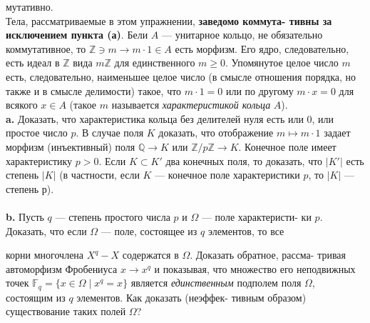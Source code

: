 мутативно.\\
\hspace*{10pt}
Тела, рассматриваемые в этом упражнении, \textbf{заведомо коммута-\linebreak
тивны за исключением пункта (а)}. Бели $A$ — унитарное кольцо,\linebreak
не обязательно коммутативное, то $\mathbb{Z} \ni m\rightarrow m\cdot1\in A$ есть морфизм. Его\linebreak
ядро, следовательно, есть идеал в $\mathbb{Z}$ вида $m\mathbb{Z}$ для единственного $m\geq0$.\linebreak
Упомянутое целое число $m$ есть, следовательно, наименьшее целое число\linebreak
(в смысле отношения порядка, но также и в смысле делимости) такое,\linebreak
что $m\cdot1=0$ или по другому $m\cdot x=0$ для всякого $x\in A$ (такое $m$ \linebreak
называется \textit{характеристикой кольца} $A$).
\\
\hspace*{10pt}\textbf{a.} Доказать, что характеристика кольца без делителей нуля есть\linebreak
или 0, или простое число $p$. В случае поля $K$ доказать, что отображение\linebreak
$m\mapsto m\cdot1$ задает морфизм (инъективный) поля $\mathbb{Q}\rightarrow K$ или $\mathbb{Z}/p\mathbb{Z}\rightarrow K$.\linebreak
Конечное поле имеет характеристику $p > 0$. Если $K\subset K'$ два конечных\linebreak
поля, то доказать, что $|K'|$ есть степень $|K|$ (в частности, если $K$ —\linebreak
конечное поле характеристики $p$, то $|K|$ — степень р).\\
\\
\hspace*{10pt}\textbf{b.} Пусть $q$ — степень простого числа $p$ и $\Omega$ — поле характеристи-\linebreak
ки $p$. Доказать, что если $\Omega$ — поле, состоящее из $q$ элементов, то все\linebreak\pagebreak


\noindent корни многочлена $X^q-X$ содержатся в $\Omega$. Доказать обратное, рассма-\linebreak
тривая автоморфизм Фробениуса $x \rightarrow x^q$ и показывая, что множество\linebreak
его неподвижных точек $\mathbb{F}_q=\{x\in \Omega\;|\;x^q=x\}$ является \textit{единственным}\linebreak
подполем поля $\Omega$, состоящим из $q$ элементов. Как доказать (неэффек-\linebreak
тивным образом) существование таких полей $\Omega$?

